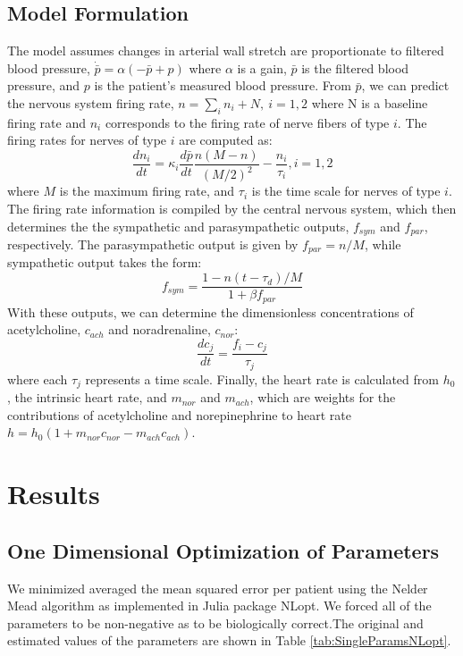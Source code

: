 \documentclass[fleqn,10pt]{wlscirep}
\begin{document}
\subsection{Model Formulation}
The model assumes changes in arterial wall stretch are proportionate to filtered blood pressure, $\dot{\bar{p}} = \alpha(-\bar p + p)$
where $\alpha$ is a gain, $\bar p$ is the filtered blood pressure, and $p$ is the patient's measured blood pressure.
From $\bar p$, we can predict the nervous system firing rate, $n = \sum_i n_i + N,~i = 1,2$
where N is a baseline firing rate and $n_i$ corresponds to the firing rate of nerve fibers of type $i$.
The firing rates for nerves of type $i$ are computed as:
\begin{equation}
\frac{dn_i}{dt} = \kappa_i \frac{d \bar p}{dt} \frac{n(M-n)}{(M/2)^2}-\frac{n_i}{\tau_i}, i = 1,2
\end{equation}
where $M$ is the maximum firing rate, and $\tau_i$ is the time scale for nerves of type $i$.
The firing rate information is compiled by the central nervous system, which then determines the the sympathetic and parasympathetic outputs, $f_{sym}$ and $f_{par}$, respectively.
The parasympathetic output is given by $f_{par} = n/M$, while sympathetic output takes the form:
\begin{equation}
f_{sym} = \frac{1-n(t-\tau_d)/M}{1+\beta f_{par}}
\end{equation}
With these outputs, we can determine the dimensionless concentrations of acetylcholine, $c_{ach}$ and noradrenaline, $c_{nor}$:
\begin{equation}
\label{dcnordt}
\frac{dc_{j}}{dt} = \frac{f_{i}-c_{j}}{\tau_{j}}
\end{equation}
where each $\tau_{j}$ represents a time scale.
Finally, the heart rate is calculated from $h_0$, the intrinsic heart rate, and $m_{nor}$ and $m_{ach}$,
which are weights for the contributions of acetylcholine and norepinephrine to heart rate $h = h_0(1+m_{nor}c_{nor} - m_{ach}c_{ach})$.
\section*{Results}
\subsection*{One Dimensional Optimization of Parameters}
We minimized averaged the mean squared error per patient using the Nelder Mead algorithm as implemented in Julia package NLopt. We forced all of the parameters to be non-negative as to be biologically correct.The original and estimated values of the parameters are shown in Table \ref{tab:SingleParamsNLopt}. %
\end{document}
